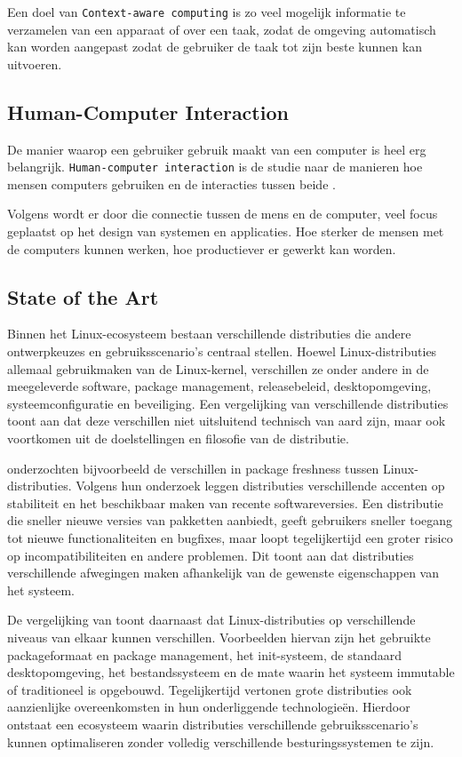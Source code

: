 \documentclass{hogent-article}
\begin{document}
Een doel van \texttt{Context-aware computing} is zo veel mogelijk informatie te verzamelen van een apparaat of over een taak, zodat de omgeving automatisch kan worden aangepast zodat de gebruiker de taak tot zijn beste kunnen kan uitvoeren. 

\subsection{Human-Computer Interaction}
\label{ssec:hci}

De manier waarop een gebruiker gebruik maakt van een computer is heel erg belangrijk. \texttt{Human-computer interaction} is de studie naar de manieren hoe mensen computers gebruiken en de interacties tussen beide \autocite{Sharples1996}.

Volgens \textcite{Lee2021} wordt er door die connectie tussen de mens en de computer, veel focus geplaatst op het design van systemen en applicaties. Hoe sterker de mensen met de computers kunnen werken, hoe productiever er gewerkt kan worden.

\subsection{State of the Art}
\label{ssec:stateoftheart}

Binnen het Linux-ecosysteem bestaan verschillende distributies die andere ontwerpkeuzes en gebruiksscenario's centraal stellen. Hoewel Linux-distributies allemaal gebruikmaken van de Linux-kernel, verschillen ze onder andere in de meegeleverde software, package management, releasebeleid, desktopomgeving, systeemconfiguratie en beveiliging. Een vergelijking van verschillende distributies toont aan dat deze verschillen niet uitsluitend technisch van aard zijn, maar ook voortkomen uit de doelstellingen en filosofie van de distributie.

\textcite{Legay2020} onderzochten bijvoorbeeld de verschillen in package freshness tussen Linux-distributies. Volgens hun onderzoek leggen distributies verschillende accenten op stabiliteit en het beschikbaar maken van recente softwareversies. Een distributie die sneller nieuwe versies van pakketten aanbiedt, geeft gebruikers sneller toegang tot nieuwe functionaliteiten en bugfixes, maar loopt tegelijkertijd een groter risico op incompatibiliteiten en andere problemen. Dit toont aan dat distributies verschillende afwegingen maken afhankelijk van de gewenste eigenschappen van het systeem.

De vergelijking van \textcite{Eylenburg2026} toont daarnaast dat Linux-distributies op verschillende niveaus van elkaar kunnen verschillen. Voorbeelden hiervan zijn het gebruikte packageformaat en package management, het init-systeem, de standaard desktopomgeving, het bestandssysteem en de mate waarin het systeem immutable of traditioneel is opgebouwd. Tegelijkertijd vertonen grote distributies ook aanzienlijke overeenkomsten in hun onderliggende technologieën. Hierdoor ontstaat een ecosysteem waarin distributies verschillende gebruiksscenario's kunnen optimaliseren zonder volledig verschillende besturingssystemen te zijn.
\end{document}
